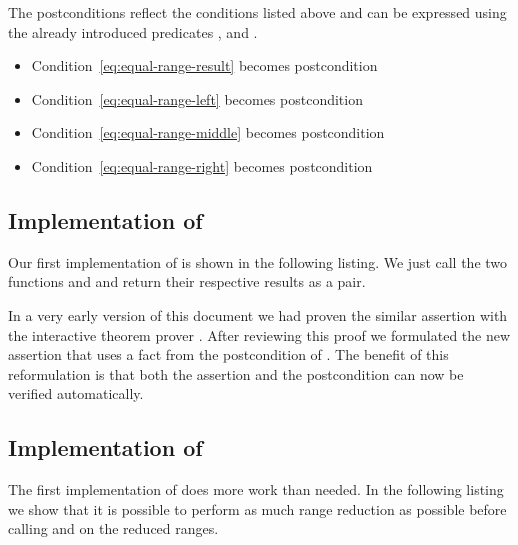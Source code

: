 The postconditions reflect the conditions listed above and can be expressed
using the already introduced predicates
,
 and .

\begin{itemize}
\item Condition~\eqref{eq:equal-range-result} becomes postcondition 
\item Condition~\eqref{eq:equal-range-left} becomes postcondition 
\item Condition~\eqref{eq:equal-range-middle} becomes postcondition 
\item Condition~\eqref{eq:equal-range-right} becomes postcondition 
\end{itemize}


\subsection{Implementation of \equalrange}

Our first implementation of  is shown in the following listing.
We just call the two functions  and 
and return their respective results as a pair.



In a very early version of this document we had proven the similar assertion
 with the interactive theorem prover \coq.
After reviewing this proof we formulated the new assertion 
that uses a fact from the postcondition of .
The benefit of this reformulation is that both the assertion 
and the postcondition  can now be verified automatically.


\subsection{Implementation of \equalrangeii}

The first implementation of  does more work than needed.
In the following listing  we show that it is possible to
perform as much range reduction as possible before calling 
and  on the reduced ranges.




